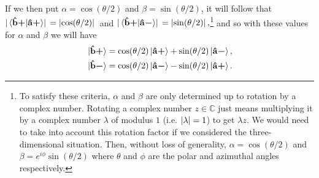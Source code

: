 If we then put  $\alpha=\cos(\theta/2)$ and $\beta=\sin(\theta/2)$, it will follow that $\abs*{\ip*{\uvbp{b}}{\uvbp{a}}}=\abs*{\cos(\theta/2)}$ and  $\abs*{\ip*{\uvbp{b}}{\uvbm{a}}}=\abs*{\sin(\theta/2)},$\footnote{To satisfy these criteria, $\alpha$ and $\beta$ are only determined up to rotation by a complex number. Rotating a complex number $z\in\mathbb{C}$ just means multiplying it by a complex number $\lambda$ of modulus $1$ (i.e. $\abs{\lambda}=1$) to get $\lambda z$. We would need to take into account this rotation factor if we considered the three-dimensional situation. Then, without loss of generality, $\alpha=\cos(\theta/2)$ and $\beta=e^{i\phi}\sin(\theta/2)$ where $\theta$ and $\phi$ are the polar and azimuthal angles respectively.} and so with these values for $\alpha$ and $\beta$ we will have
\begin{subequations}\label{spintrans}
\begin{align}
\ket*{\vb{\hat{{b}}}\bm{+}}&= \cos(\theta/2)\ket*{\vb{\hat{{a}}}\bm{+}}+\sin(\theta/2) \ket*{\vb{\hat{{a}}}\bm{-}},\label{spintrans1}\\
\ket*{\vb{\hat{{b}}}\bm{-}}&= \cos(\theta/2)\ket*{\vb{\hat{{a}}}\bm{-}}-\sin(\theta/2) \ket*{\vb{\hat{{a}}}\bm{+}}.\label{spintrans2}
\end{align}
\end{subequations}
